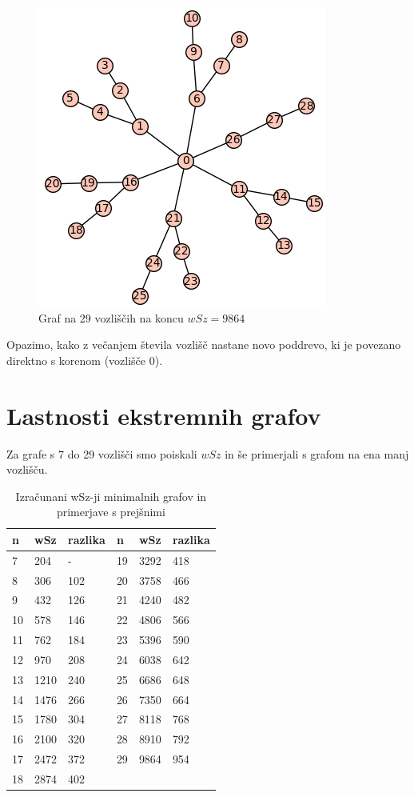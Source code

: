 \documentclass[12pt, a4paper]{article}
\begin{document}
\begin{figure}[h]
\centering
\includegraphics[scale=0.4]{koncni_graf29}
\caption{Graf na 29 vozliščih na koncu $wSz = 9864$}
\end{figure}

Opazimo, kako z večanjem števila vozlišč nastane novo poddrevo, ki je povezano direktno s korenom (vozlišče 0). 

\newpage

\section[Lastnosti ekstremnih grafov]{Lastnosti ekstremnih grafov}

Za grafe s 7 do 29 vozlišči smo poiskali $wSz$ in še primerjali s grafom na ena manj vozlišču.

\begin{table}[!h]
\centering
\caption{Izračunani wSz-ji minimalnih grafov in primerjave s prejšnimi}
\begin{tabularx}{\linewidth}{|*{6}{X|}}
\hline
n & wSz & razlika &  n & wSz & razlika      \\ \hline
  7 & 204& -     & 19 & 3292& 418         \\ \hline
  8 & 306& 102& 20 & 3758&  466      \\ \hline
  9 & 432& 126& 21 & 4240&  482      \\ \hline
10 & 578& 146& 22 & 4806&  566      \\ \hline
11 & 762& 184& 23 & 5396&  590      \\ \hline
12 & 970& 208& 24 & 6038&  642       \\ \hline
13 & 1210& 240& 25 & 6686& 648         \\ \hline
14 & 1476& 266& 26 & 7350& 664        \\ \hline
15 & 1780& 304& 27 & 8118& 768       \\ \hline
16 & 2100& 320& 28 & 8910& 792        \\ \hline
17 & 2472& 372& 29 & 9864& 954         \\ \hline
18 & 2874& 402&  &&         \\ \hline
\end{tabularx}
\end{table}
\end{document}
